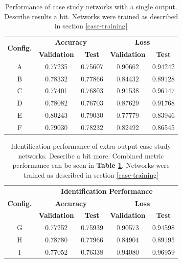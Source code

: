 \begin{table}[h!]
\begin{center}
\begin{tabular}{|c|c|c|c|c|}
\hline
\multirow{2}{*}{\textbf{Config.}} & \multicolumn{2}{|c|}{\textbf{Accuracy}} & \multicolumn{2}{|c|}{\textbf{Loss}} \\ \cline{2-5}
 & \textbf{Validation} & \textbf{Test} & \textbf{Validation} & \textbf{Test} \\ \hline
A & 0.77235 & 0.75607 & 0.90662 & 0.94242 \\ \hline
B & 0.78332 & 0.77866 & 0.84432 & 0.89128 \\ \hline
C & 0.77401 & 0.76803 & 0.91538 & 0.96147 \\ \hline
D & 0.78082 & 0.76703 & 0.87629 & 0.91768 \\ \hline
E & 0.80243 & 0.79030 & 0.77779 & 0.83946 \\ \hline
F & 0.79030 & 0.78232 & 0.82492 & 0.86545 \\ \hline
\end{tabular}
\end{center}
\caption[Performance of case study networks with a single output]{Performance of case study networks with a single output. Describe results a bit. Networks were trained as described in section \ref{case-training}}
\label{tab:case-results}
\end{table}


\begin{table}[h!]
\begin{center}
\begin{tabular}{|c|c|c|c|c|}
\hline
\multirow{3}{*}{\textbf{Config.}} & \multicolumn{4}{|c|}{\textbf{Identification Performance}} \\ \cline{2-5}
& \multicolumn{2}{|c|}{\textbf{Accuracy}} & \multicolumn{2}{|c|}{\textbf{Loss}} \\ \cline{2-5}
& \textbf{Validation} & \textbf{Test} & \textbf{Validation} & \textbf{Test} \\ \hline
G & 0.77252 & 0.75939 & 0.90573 & 0.94598 \\ \hline
H & 0.78780 & 0.77966 & 0.84904 & 0.89195 \\ \hline
I & 0.77052 & 0.76338 & 0.94080 & 0.96959 \\ \hline
\end{tabular}
\end{center}
\caption[Identification performance of extra output case study networks]{Identification performance of extra output case study networks. Describe a bit more. Combined metric performance can be seen in \textbf{Table \ref{tab:case-results}}. Networks were trained as described in section \ref{case-training}}
\label{tab:case-results-id}
\end{table}


